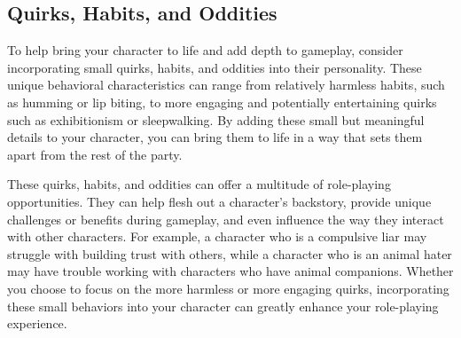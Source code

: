 \hypertarget{quirks-habits-and-oddities}{%
\subsection{Quirks, Habits, and
Oddities}\label{quirks-habits-and-oddities}}

To help bring your character to life and add depth to gameplay, consider
incorporating small quirks, habits, and oddities into their personality.
These unique behavioral characteristics can range from relatively
harmless habits, such as humming or lip biting, to more engaging and
potentially entertaining quirks such as exhibitionism or sleepwalking.
By adding these small but meaningful details to your character, you can
bring them to life in a way that sets them apart from the rest of the
party.

These quirks, habits, and oddities can offer a multitude of role-playing
opportunities. They can help flesh out a character's backstory, provide
unique challenges or benefits during gameplay, and even influence the
way they interact with other characters. For example, a character who is
a compulsive liar may struggle with building trust with others, while a
character who is an animal hater may have trouble working with
characters who have animal companions. Whether you choose to focus on
the more harmless or more engaging quirks, incorporating these small
behaviors into your character can greatly enhance your role-playing
experience.

